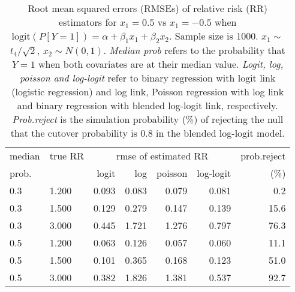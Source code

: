 \documentclass[12pt,a4paper]{article}
\begin{document}
\begin{table}[H] 
\small\sf\centering 
\caption{Root mean squared errors (RMSEs) of relative risk (RR) estimators for $x_1=0.5$ vs $x_1=-0.5$ when $\mbox{logit}(P[Y=1])=\alpha+\beta_1 x_1 + \beta_2 x_2$. Sample size is 1000. $x_1 \sim $$t_4/\sqrt{2}$, $x_2 \sim N(0,1)$. {\it Median prob} refers to the probability that $Y=1$ when both covariates are at their median value. {\it Logit, log, poisson and log-logit} refer to binary regression with logit link (logistic regression) and log link, Poisson regression with log link and binary regression with blended log-logit link, respectively. {\it Prob.reject} is the simulation probability (\%) of rejecting the null that the cutover probability is $0.8$ in the blended log-logit model.} 
\begin{tabular}{llrrrrr} 
\toprule 
median & true RR & \multicolumn{4}{c}{rmse of estimated RR} & prob.reject \\ 
prob. & & logit & log & poisson & log-logit  & (\%) \\ \midrule 
0.3 & 1.200 & 0.093 & 0.083 & 0.079 & 0.081 &  0.2 \\  
0.3 & 1.500 & 0.129 & 0.279 & 0.147 & 0.139 & 15.6 \\  
0.3 & 3.000 & 0.445 & 1.721 & 1.276 & 0.797 & 76.3 \\  
0.5 & 1.200 & 0.063 & 0.126 & 0.057 & 0.060 & 11.1 \\  
0.5 & 1.500 & 0.101 & 0.365 & 0.168 & 0.123 & 51.0 \\  
0.5 & 3.000 & 0.382 & 1.826 & 1.381 & 0.537 & 92.7 \\  
\bottomrule 
\end{tabular} 
\end{table} 
\end{document}
